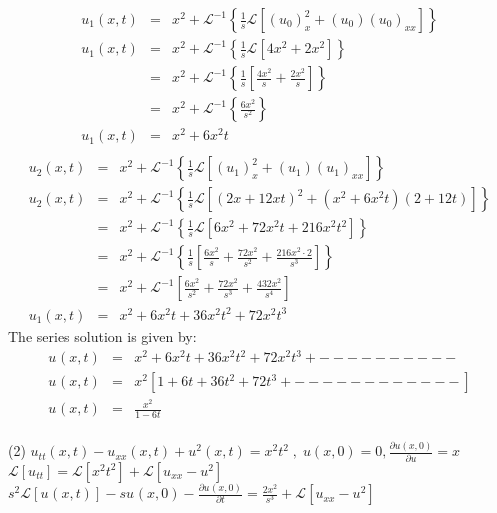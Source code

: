 \documentclass[a4paper 11pt]{article}
\newcommand{\Laplace}{\mathcal{L}}
\newcommand{\Un}[2]{u_{#1}(#2)}
\newcommand{\NI}{\noindent}
\newcommand{\InverseL}[1]{\Laplace^{-1}\left[#1\right]}
\newcommand{\LT}[1]{\Laplace \left[#1\right]}
\newcommand{\Unx}[1]{\Un{#1}{x,t}}
\newcommand{\InverseLx}[1]{\Laplace^{-1}\left\{ #1 \right\}}
\newcommand{\Usub}[1]{u_{#1}}
\newcommand{\Usup}[1]{u^{#1}}
\begin{document}
\begin{eqnarray*}
\Unx{1} &=& x^2 + \InverseLx{\frac{1}{s}\LT{\left(u_{0}\right)_{x}^{2} + \left(u_{0}\right)\left(u_{0}\right)_{xx}}}    \\[0.1cm]
\Unx{1} &=& x^2 + \InverseLx{\frac{1}{s}\LT{4x^2 + 2x^2}} \\[0.1cm]
&=& x^2 + \InverseLx{\frac{1}{s}\left[\frac{4x^2}{s} + \frac{2x^2}{s}\right]} \\[0.1cm]
&=& x^2 + \InverseLx{\frac{6x^2}{s^2}} \\[0.3cm]
\Unx{1} &=& x^2 + 6x^{2}t\\[0.1cm]
\label{eq:}
\end{eqnarray*}
\begin{eqnarray*}
\Unx{2} &=& x^2 + \InverseLx{\frac{1}{s}\LT{\left(u_{1}\right)_{x}^{2} + \left(u_{1}\right)\left(u_{1}\right)_{xx}}}    \\[0.1cm]
\Unx{2} &=& x^2 + \InverseLx{\frac{1}{s}\LT{(2x + 12xt)^2 + (x^2 + 6x^{2}t)(2+12t)}} \\[0.1cm]
&=& x^2 + \InverseLx{\frac{1}{s}\LT{6x^2 + 72x^2t + 216x^2t^2}} \\[0.1cm]
&=& x^2 + \InverseLx{\frac{1}{s}\left[\frac{6x^2}{s} + \frac{72x^2}{s^2} + \frac{216x^2 \cdot 2}{s^3} \right]} \\
&=& x^2 + \InverseL{\frac{6x^2}{s^2} + \frac{72x^2}{s^3} + \frac{432x^2}{s^4}}\\[0.3cm]
\Unx{1} &=& x^2 + 6x^2t + 36x^2t^2 + 72x^2t^3
\label{eq:}
\end{eqnarray*}
The series solution is given by:
\begin{eqnarray*}
\Unx{} &=& x^2 + 6x^2t + 36x^2t^2 + 72x^2t^3 + - - - - - - - - - -\\[0.25cm]
\Unx{} &=& x^2\left[1+6t + 36t^2 + 72t^3 + - - - - - - - - - - - -  \right] \\[0.27cm]
\Unx{} &=& \frac{x^2}{1-6t}\\
\label{eq:}
\end{eqnarray*}

\NI (2) $\displaystyle\Unx{tt} - \Unx{xx} + u^{2}(x,t) = x^2t^2 \; , \; u(x,0) = 0, \frac{\partial u(x,0)}{\partial u} = x 
$\\[0.4cm]
$\displaystyle
 \LT{u_{tt}} = \LT{x^2t^2} + \LT{u_{xx} - u^2}
$\\[0.2cm]
$\displaystyle
s^2 \LT{\Unx{}} - s\Un{}{x,0} - \frac{\partial \Un{}{x,0}}{\partial t} = \frac{2x^2}{s^3} + \LT{\Usub{xx} - \Usup{2}}
$\\[0.2cm]
\end{document}
